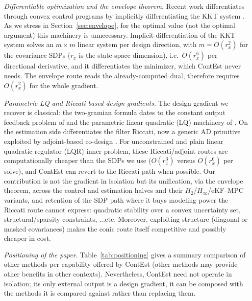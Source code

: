 \documentclass[twocolumn,amsthm]{autart}
\begin{document}
\emph{Differentiable optimization and the envelope theorem.}
Recent work differentiates through convex control programs by implicitly differentiating the KKT system \cite{amos2017optnet,agrawal2019differentiable}. As we stress in
Section~\ref{sec:envelope}, for the optimal value (not the optimal argument) this machinery is unnecessary. Implicit differentiation of the KKT system solves an $m\times m$ linear system per design
direction, with $m=O(r_x^2)$ for the covariance SDPs ($r_x$ is the state-space dimension), i.e.\ $O(r_x^6)$ per
directional derivative, and it differentiates the minimizer, which ContEst
never needs. The envelope route reads the already-computed dual, therefore requires $O(r_x^2)$ for the whole gradient.

\emph{Parametric LQ and Riccati-based design gradients.}
The design gradient we recover is classical: the two-gramian formula dates to the
constant output feedback problem of \cite{levine1970determination} and the
parametric linear quadratic (LQ) machinery of \cite{makila1987computational,rautert1997computational}. On the estimation side \cite{belabbas2016geometric} differentiates the filter
Riccati, now a generic AD primitive \cite{kao2020autodiff} exploited by
adjoint-based co-design \cite{he2026efficient}. For unconstrained and plain linear quadratic regulator (LQR) inner problem, these
Riccati/adjoint routes are computationally cheaper than the SDPs we use ($O(r_x^3)$ versus
$O(r_x^6)$ per solve), and ContEst can revert to the Riccati path when possible. Our
contribution is not the gradient in isolation but its unification, via the envelope theorem, across the control and estimation halves and their
$H_2$/$H_\infty$/eKF--MPC variants, and retention of the SDP path where it buys modeling power the Riccati route cannot express: quadratic stability over a convex uncertainty set, structural/sparsity
constraints, ...etc. Moreover, exploiting structure (diagonal or masked covariances) makes
the conic route itself competitive and possibly cheaper in cost.

\emph{Positioning of the paper.}
Table~\ref{tab:positioning} gives a summary comparison of other methods per capability offered by ContEst (other methods may provide other benefits in other contexts). Nevertheless, ContEst need not operate in isolation; its only external output is a design gradient, it can be composed with the methods it is compared against rather than replacing them.
\end{document}
